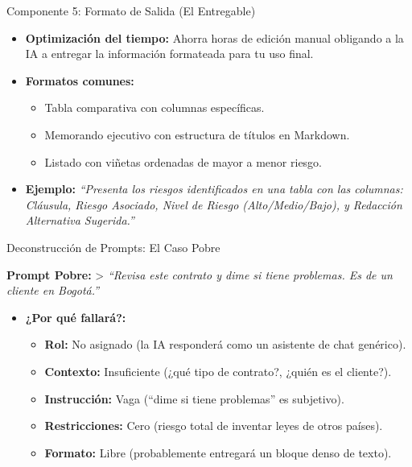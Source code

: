 \documentclass[aspectratio=169]{beamer}
\begin{document}
\begin{frame}[fragile]{Componente 5: Formato de Salida (El Entregable)}


\begin{itemize}
  \item \textbf{Optimización del tiempo:} Ahorra horas de edición manual obligando a la IA a entregar la información formateada para tu uso final.
  \item \textbf{Formatos comunes:}
  \begin{itemize}
    \item Tabla comparativa con columnas específicas.
    \item Memorando ejecutivo con estructura de títulos en Markdown.
    \item Listado con viñetas ordenadas de mayor a menor riesgo.
  \end{itemize}
  \item \textbf{Ejemplo:} \textit{``Presenta los riesgos identificados en una tabla con las columnas: Cláusula, Riesgo Asociado, Nivel de Riesgo (Alto/Medio/Bajo), y Redacción Alternativa Sugerida.''}
\end{itemize}
\end{frame}



\begin{frame}[fragile]{Deconstrucción de Prompts: El Caso Pobre}


\textbf{Prompt Pobre:}
> \textit{``Revisa este contrato y dime si tiene problemas. Es de un cliente en Bogotá.''}

\begin{itemize}
  \item \textbf{¿Por qué fallará?:}
  \begin{itemize}
    \item \textbf{Rol:} No asignado (la IA responderá como un asistente de chat genérico).
    \item \textbf{Contexto:} Insuficiente (¿qué tipo de contrato?, ¿quién es el cliente?).
    \item \textbf{Instrucción:} Vaga (``dime si tiene problemas'' es subjetivo).
    \item \textbf{Restricciones:} Cero (riesgo total de inventar leyes de otros países).
    \item \textbf{Formato:} Libre (probablemente entregará un bloque denso de texto).
  \end{itemize}
\end{itemize}
\end{frame}
\end{document}
